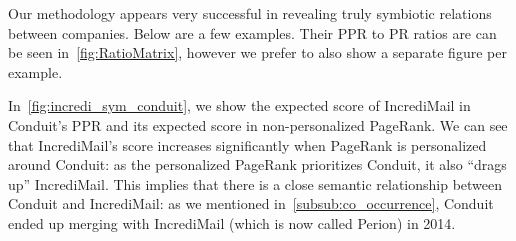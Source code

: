 \documentclass[11pt,oneside]{book}
\begin{document}

Our methodology appears very successful in revealing truly symbiotic relations between companies. Below are a few examples. Their PPR to PR ratios are can be seen in~\autoref{fig:RatioMatrix}, however we prefer to also show a separate figure per example.

In~\autoref{fig:incredi_sym_conduit}, we show the expected score of IncrediMail in Conduit's PPR and its expected score in non-personalized PageRank. We can see that IncrediMail's score increases significantly when PageRank is personalized around Conduit: as the personalized PageRank prioritizes Conduit, it also ``drags up'' IncrediMail. This implies that there is a close semantic relationship between Conduit and IncrediMail: as we mentioned in~\autoref{subsub:co_occurrence}, Conduit ended up merging with IncrediMail (which is now called Perion) in 2014. 
\end{document}
